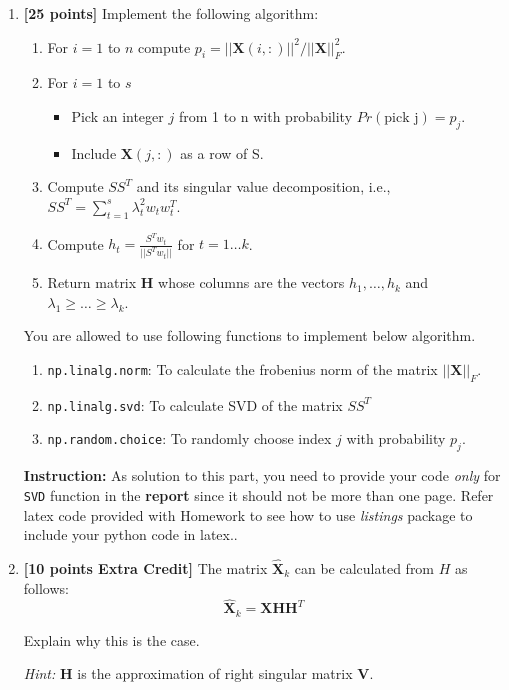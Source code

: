 \documentclass[letterpaper]{article}
\newcommand {\bX}{\mathbf{X}}
\newcommand {\bV}{\mathbf{V}}
\newcommand {\bH}{\mathbf{H}}
\begin{document}
\begin{enumerate}
\item \textbf{[25 points]} Implement the following algorithm:

\begin{enumerate} 
\item For $i = 1$ to $n$ compute $p_i = ||\bX(i,:)||^2/||\bX||^2_F$.
\item For $i = 1$ to $s$ 
      \begin{itemize} 
      \item Pick an integer $j$ from 1 to n with probability $Pr(\text{pick j})=p_j$.
      \item Include $\bX(j,:)$ as a row of S.
      \end{itemize}
\item Compute $S S^T$ and its singular value decomposition, i.e., $SS^T =\sum_{t=1}^s \lambda_t^2 w_t w_t^T$.
\item Compute $h_t =\frac{S^T w_t}{||S^T w_t||}$ for $t=1\ldots k$.
\item Return matrix $\bH$ whose columns are the vectors $h_1,\ldots,h_k$ and $\lambda_1 \geq \ldots \geq \lambda_k$. 
\end{enumerate}

You are allowed to use following functions to implement below algorithm. 
\begin{enumerate}
    \item \texttt{np.linalg.norm}: To calculate the frobenius norm of the matrix $||\bX||_F$.
    \item \texttt{np.linalg.svd}: To calculate SVD of the matrix $SS^T$
    \item \texttt{np.random.choice}: To randomly choose index $j$ with probability $p_j$. 
\end{enumerate}

\textbf{Instruction:} As solution to this part, you need to provide your code \textit{only} for \texttt{SVD} function in the \textbf{report} since it should not be more than one page. Refer latex code provided with Homework to see how to use \textit{listings} package to include your python code in latex..


\item \textbf{[10 points Extra Credit]} The matrix $\hat{\bX}_k$ can be calculated from $H$ as follows:
$$\hat{\bX}_k = \bX\bH\bH^T$$


Explain why this is the case.

\textit{Hint:}  $\bH$ is the approximation of right singular matrix $\bV$. 



\end{enumerate}
\end{document}
